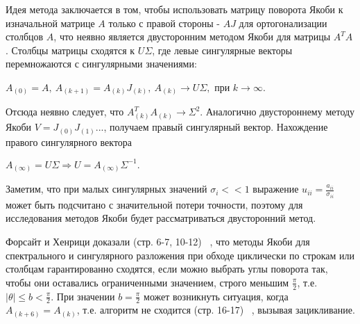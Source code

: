 Идея метода заключается в том, чтобы использовать матрицу поворота Якоби к изначальной матрице $A$ только с правой стороны - $AJ$ для ортогонализации столбцов $A$, что неявно является двусторонним методом Якоби для матрицы $A^TA$.
Столбцы матрицы сходятся к $U\Sigma$, где левые сингулярные векторы перемножаются с сингулярными значениями:
\begin{center}
     $A_{(0)}=A,\ A_{(k+1)} = A_{(k)}J_{(k)},\ A_{(k)} \longrightarrow U\Sigma, \text{ при } k\to\infty$.
 \end{center}
 Отсюда неявно следует, что $A^T_{(k)}A_{(k)} \to \Sigma^2$. Аналогично двустороннему методу Якоби $V = J_{(0)}J_{(1)}...$, получаем правый сингулярный вектор. Нахождение правого сингулярного вектора 
 \begin{center}
     $A_{(\infty)} = U\Sigma \Rightarrow U = A_{(\infty)}\Sigma^{-1}.$
 \end{center}

 Заметим, что при малых сингулярных значений $\sigma_i<<1$ выражение $u_{ii} = \frac{a_{ii}}{\sigma_{ii}}$ может быть подсчитано с значительной потери точности, поэтому для исследования методов Якоби будет рассматриваться двусторонний метод.

Форсайт и Хенрици доказали (стр. 6-7, 10-12) ~\cite{Forsythe1960}, что методы Якоби для спектрального и сингулярного разложения при обходе циклически по строкам или столбцам гарантированно сходятся, если можно выбрать углы поворота так, чтобы они оставались ограниченными значением, строго меньшим $\frac{\pi}{2}$, т.е. $\left|\theta\right| \le b <\frac{\pi}{2}$. При значении $b = \frac{\pi}{2}$ может возникнуть ситуация, когда $A_{(k+6)}=A_{(k)}$, т.е. алгоритм не сходится (стр. 16-17) ~\cite{Forsythe1960}, вызывая зацикливание. 

